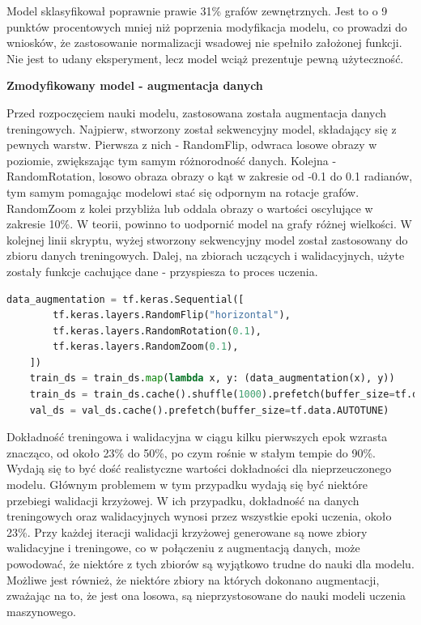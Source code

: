 Model sklasyfikował poprawnie prawie 31\% grafów zewnętrznych.
Jest to o 9 punktów procentowych mniej niż poprzenia modyfikacja modelu,
co prowadzi do wniosków, że zastosowanie normalizacji wsadowej nie spełniło założonej funkcji.
Nie jest to udany eksperyment, lecz model wciąż prezentuje pewną użyteczność.

\textbf{Zmodyfikowany model - augmentacja danych}

Przed rozpoczęciem nauki modelu, zastosowana została augmentacja danych treningowych.
Najpierw, stworzony został sekwencyjny model, składający się z pewnych warstw.
Pierwsza z nich - RandomFlip, odwraca losowe obrazy w poziomie, zwiększając tym samym różnorodność danych.
Kolejna - RandomRotation, losowo obraza obrazy o kąt w zakresie od -0.1 do 0.1 radianów,
tym samym pomagając modelowi stać się odpornym na rotacje grafów.
RandomZoom z kolei przybliża lub oddala obrazy o wartości oscylujące w zakresie 10\%.
W teorii, powinno to uodpornić model na grafy różnej wielkości.
W kolejnej linii skryptu, wyżej stworzony sekwencyjny model został zastosowany do zbioru danych treningowych.
Dalej, na zbiorach uczących i walidacyjnych, użyte zostały funkcje cachujące dane - przyspiesza to proces uczenia.

\begin{lstlisting}[language=Python,caption=Listing zmodyfikowanego skryptu poprzedzającego tworzenie modelu z walidacją krzyżową
	- wersja 3,label={tests-model-crossval3}]
	data_augmentation = tf.keras.Sequential([
        tf.keras.layers.RandomFlip("horizontal"),
        tf.keras.layers.RandomRotation(0.1),
        tf.keras.layers.RandomZoom(0.1),
    ])
    train_ds = train_ds.map(lambda x, y: (data_augmentation(x), y))
    train_ds = train_ds.cache().shuffle(1000).prefetch(buffer_size=tf.data.AUTOTUNE)
    val_ds = val_ds.cache().prefetch(buffer_size=tf.data.AUTOTUNE)
\end{lstlisting}

Dokładność treningowa i walidacyjna w ciągu kilku pierwszych epok wzrasta znacząco,
od około 23\% do 50\%, po czym rośnie w stałym tempie do 90\%.
Wydają się to być dość realistyczne wartości dokładności dla nieprzeuczonego modelu.
Głównym problemem w tym przypadku wydają się być niektóre przebiegi walidacji krzyżowej.
W ich przypadku, dokładność na danych treningowych oraz walidacyjnych wynosi przez wszystkie epoki uczenia, około 23\%.
Przy każdej iteracji walidacji krzyżowej generowane są nowe zbiory walidacyjne i treningowe,
co w połączeniu z augmentacją danych, może powodować, że niektóre z tych zbiorów są wyjątkowo trudne do nauki dla modelu.
Możliwe jest również, że niektóre zbiory na których dokonano augmentacji, zważając na to, że jest ona losowa,
są nieprzystosowane do nauki modeli uczenia maszynowego.

